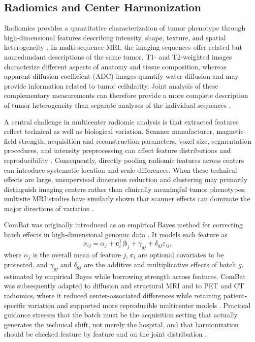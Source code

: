 \documentclass[conference]{IEEEtran}
\begin{document}
\subsection{Radiomics and Center Harmonization}

Radiomics provides a quantitative characterization of tumor phenotype through high-dimensional features describing intensity, shape, texture, and spatial heterogeneity \cite{gillies2016radiomics}. In multi-sequence MRI, the imaging sequences offer related but nonredundant descriptions of the same tumor. T1- and T2-weighted images characterize different aspects of anatomy and tissue composition, whereas apparent diffusion coefficient (ADC) images quantify water diffusion and may provide information related to tumor cellularity. Joint analysis of these complementary measurements can therefore provide a more complete description of tumor heterogeneity than separate analyses of the individual sequences \cite{subramanian2020multiomics,vahabi2022unsupervised}.

A central challenge in multicenter radiomic analysis is that extracted features reflect technical as well as biological variation. Scanner manufacturer, magnetic-field strength, acquisition and reconstruction parameters, voxel size, segmentation procedures, and intensity preprocessing can affect feature distributions and reproducibility \cite{mali2021radiomics,zwanenburg2020ibsi}. Consequently, directly pooling radiomic features across centers can introduce systematic location and scale differences. When these technical effects are large, unsupervised dimension reduction and clustering may primarily distinguish imaging centers rather than clinically meaningful tumor phenotypes; multisite MRI studies have similarly shown that scanner effects can dominate the major directions of variation \cite{fortin2018cortical,leek2010tackling}.

ComBat was originally introduced as an empirical Bayes method for correcting batch effects in high-dimensional genomic data \cite{johnson2007combat}. It models each feature as
\begin{equation}
    x_{ij} = \alpha_j + \mathbf{c}_i^{\mathsf T}\boldsymbol\beta_j + \gamma_{gj} + \delta_{gj}\varepsilon_{ij},
\end{equation}
where $\alpha_j$ is the overall mean of feature $j$, $\mathbf{c}_i$ are optional covariates to be protected, and $\gamma_{gj}$ and $\delta_{gj}$ are the additive and multiplicative effects of batch $g$, estimated by empirical Bayes while borrowing strength across features. ComBat was subsequently adapted to diffusion and structural MRI \cite{fortin2017dti,fortin2018cortical} and to PET and CT radiomics, where it reduced center-associated differences while retaining patient-specific variation and supported more reproducible multicenter models \cite{orlhac2018postreconstruction,daano2020combat,masson2021harmonization}. Practical guidance stresses that the batch must be the acquisition setting that actually generates the technical shift, not merely the hospital, and that harmonization should be checked feature by feature and on the joint distribution \cite{orlhac2022guide}.
\end{document}
